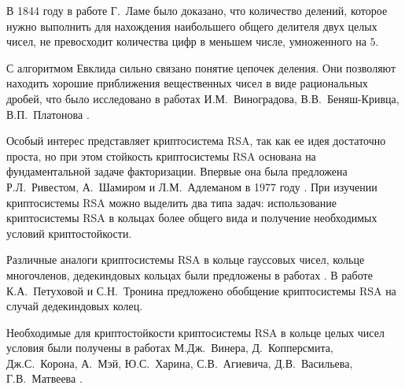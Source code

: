 \documentclass[_00_dissertation.tex]{subfiles}
\begin{document}
В 1844 году в работе Г.~Ламе было доказано, что количество делений, которое нужно выполнить для нахождения наибольшего общего делителя двух целых чисел, не превосходит количества цифр в меньшем числе, умноженного на $5$.

С алгоритмом Евклида сильно связано понятие цепочек деления.
Они позволяют находить хорошие приближения вещественных чисел в виде рациональных дробей, что было исследовано в работах И.М.~Виноградова,  В.В.~Беняш-Кривца, В.П.~Платонова \cite{source:Benyash-Krivets_1, source:Benyash-Krivets_2, source:Vinogradov}.

Особый интерес представляет криптосистема RSA, так как ее идея достаточно проста, но при этом стойкость криптосистемы RSA основана на фундаментальной задаче факторизации.
Впервые она была предложена Р.Л.~Ривестом, А.~Шамиром и Л.М.~Адлеманом в 1977 году \cite{source:Rivest}.
При изучении криптосистемы RSA можно выделить два типа задач: использование криптосистемы RSA в кольцах более общего вида и получение необходимых условий криптостойкости.

Различные аналоги криптосистемы RSA в кольце гауссовых чисел, кольце многочленов, дедекиндовых кольцах были предложены в работах \cite{source:El_Kassar, source:Elkamchouchi, source:Koval, source:Li}.
В работе К.А.~Петуховой и С.Н.~Тронина \cite{source:Petukhova} предложено обобщение криптосистемы RSA на случай дедекиндовых колец.

Необходимые для криптостойкости криптосистемы RSA в кольце целых чисел условия были получены в работах М.Дж.~Винера, Д.~Копперсмита, Дж.С.~Корона, А.~Мэй, Ю.С.~Харина, С.В.~Агиевича, Д.В.~Васильева, Г.В.~Матвеева \cite{source:Matveev_2019, source:Matveev_2018, source:Kharin, source:Coppersmith, source:Coron, source:Wiener}.

\onlyinsubfile{
    
}
\end{document}
